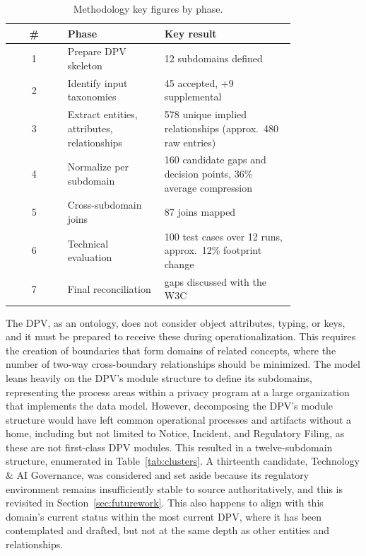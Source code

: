 \documentclass[10pt,letterpaper,twocolumn,twoside]{rho-class/rho}
\begin{document}
\begin{table}[ht]
\centering
\caption{Methodology key figures by phase.}
\label{tab:phases}
\footnotesize
\begin{tabular}{@{}c p{0.34\linewidth} p{0.46\linewidth}@{}}
\hline
\# & Phase & Key result \\
\hline
1 & Prepare DPV skeleton & 12 subdomains defined \\
2 & Identify input taxonomies & 45 accepted, +9 supplemental \\
3 & Extract entities, attributes, relationships & 578 unique implied relationships (approx.\ 480 raw entries) \\
4 & Normalize per subdomain & 160 candidate gaps and decision points, 36\% average compression \\
5 & Cross-subdomain joins & 87 joins mapped \\
6 & Technical evaluation & 100 test cases over 12 runs, approx.\ 12\% footprint change \\
7 & Final reconciliation & gaps discussed with the W3C \\
\hline
\end{tabular}
\end{table}

The DPV, as an ontology, does not consider object attributes, typing, or keys, and it must be prepared to receive these during operationalization. This requires the creation of boundaries that form domains of related concepts, where the number of two-way cross-boundary relationships should be minimized. The model leans heavily on the DPV's module structure to define its subdomains, representing the process areas within a privacy program at a large organization that implements the data model. However, decomposing the DPV's module structure would have left common operational processes and artifacts without a home, including but not limited to Notice, Incident, and Regulatory Filing, as these are not first-class DPV modules. This resulted in a twelve-subdomain structure, enumerated in Table~\ref{tab:clusters}. A thirteenth candidate, Technology \& AI Governance, was considered and set aside because its regulatory environment remains insufficiently stable to source authoritatively, and this is revisited in Section~\ref{sec:futurework}. This also happens to align with this domain's current status within the most current DPV, where it has been contemplated and drafted, but not at the same depth as other entities and relationships.
\end{document}
